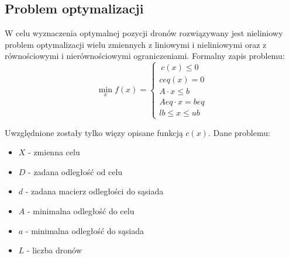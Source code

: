 \documentclass[a4paper, 11pt, oneside]{article}
\begin{document}
\subsection{Problem optymalizacji}
W celu wyznaczenia optymalnej pozycji dronów rozwiązywany jest nieliniowy problem optymalizacji wielu zmiennych z liniowymi i nieliniowymi oraz z równościowymi i nierównościowymi ograniczeniami. Formalny zapis problemu:
\begin{equation}
\operatorname*{min}_x  f(x)=
	\begin{cases}
	\ c(x) \leq 0
	\\
	ceq(x)=0
	\\
	A \cdot x\leq b
	\\
	Aeq \cdot x =beq
	\\
	lb \leq x \leq ub
	\end{cases}
\end{equation}

Uwzględnione zostały tylko więzy opisane funkcją $c(x)$.
Dane problemu:
\begin{itemize}
\item $X$ - zmienna celu
\item $D$ - zadana odległość od celu
\item $d$ - zadana macierz odległości do sąsiada
\item $A$  - minimalna odległość do celu
\item $a$ -  minimalna odległość do sąsiada
\item $L$ - liczba dronów
\end{itemize}
\end{document}
